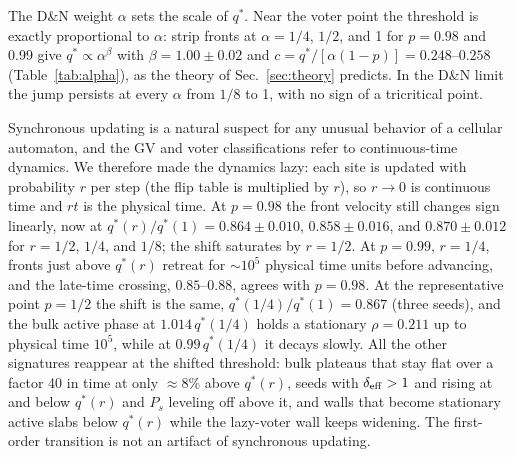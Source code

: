 \documentclass[pre,twocolumn,superscriptaddress,showpacs,floatfix]{revtex4-2}
\newcommand{\qs}{q^{*}}
\begin{document}
The D\&N weight $\alpha$ sets the scale of $\qs$. Near the voter point the threshold is exactly
proportional to $\alpha$: strip fronts at $\alpha = 1/4$, $1/2$, and 1 for $p = 0.98$ and 0.99 give
$\qs\propto\alpha^{\beta}$ with $\beta = 1.00\pm0.02$ and $c = \qs/[\alpha(1-p)] = 0.248$--$0.258$
(Table~\ref{tab:alpha}), as the theory of Sec.~\ref{sec:theory} predicts. In the D\&N limit the
jump persists at every $\alpha$ from $1/8$ to 1, with no sign of a tricritical point.

Synchronous updating is a natural suspect for any unusual behavior of a cellular automaton, and
the GV and voter classifications refer to continuous-time dynamics. We therefore made the
dynamics lazy: each site is updated with probability $r$ per step (the flip table is multiplied
by $r$), so $r\to 0$ is continuous time and $rt$ is the physical time. At $p = 0.98$ the front
velocity still changes sign linearly, now at $\qs(r)/\qs(1) = 0.864\pm0.010$, $0.858\pm0.016$,
and $0.870\pm0.012$ for $r = 1/2$, $1/4$, and $1/8$; the shift saturates by $r = 1/2$. At
$p = 0.99$, $r = 1/4$, fronts just above $\qs(r)$ retreat for $\sim 10^5$ physical time units
before advancing, and the late-time crossing, $0.85$--$0.88$, agrees with $p = 0.98$. At the
representative point $p = 1/2$ the shift is the same, $\qs(1/4)/\qs(1) = 0.867$ (three seeds), and
the bulk active phase at $1.014\,\qs(1/4)$ holds a stationary $\rho = 0.211$ up to physical time
$10^5$, while at $0.99\,\qs(1/4)$ it decays slowly. All the other signatures reappear at the
shifted threshold: bulk plateaus that
stay flat over a factor 40 in time at only $\approx 8\%$ above $\qs(r)$, seeds with $\delta_{\rm
eff}>1$ and rising at and below $\qs(r)$ and $P_s$ leveling off above it, and walls that become
stationary active slabs below $\qs(r)$ while the lazy-voter wall keeps widening. The first-order
transition is not an artifact of synchronous updating.
\end{document}
